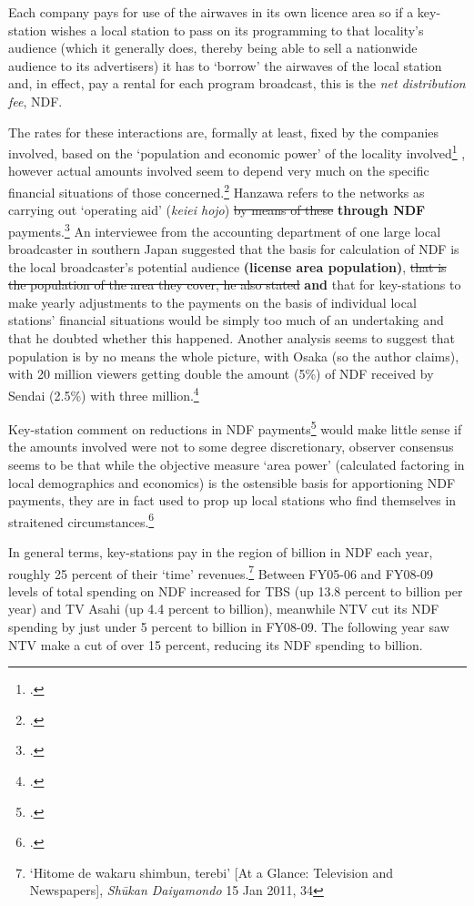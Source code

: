 \documentclass[11pt, oneside, a4paper, headsepline]{scrartcl}
\newcommand{\citej}[2] {\footcite[\nopp #1]{#2} }
\newcommand{\cjk}[1]{{\fontspec[Scale=0.9]{Hiragino Mincho Pro}#1}}
\newcommand{\ty}{\textyen}
\begin{document}
\bigskip

Each company pays for use of the airwaves in its own licence area so if a key-station wishes a local station to pass on its programming to that locality's audience (which it generally does, thereby being able to sell a nationwide audience to its advertisers) it has to `borrow' the airwaves of the local station and, in effect, pay a rental for each program broadcast, this is the \emph{net distribution fee}, NDF.

The rates for these interactions are, formally at least, fixed by the companies involved, based on the `population and economic power' of the locality involved\citej{139--40}{Sugaya:2000}, however actual amounts involved seem to depend very much on the specific financial situations of those concerned.\citej{109}{Usui:2003} Hanzawa refers to the networks as carrying out `operating aid' (\emph{keiei hojo}) \st{by means of these} \textbf{through NDF} payments.\citej{1}{Hanzawa:2003} An interviewee from the accounting department of one large local broadcaster in southern Japan suggested that the basis for calculation of NDF is the local broadcaster's potential audience \textbf{(license area population)}, \st{that is the population of the area they cover, he also stated} \textbf{and} that for key-stations to make yearly adjustments to the payments on the basis of individual local stations' financial situations would be simply too much of an undertaking and that he doubted whether this happened. Another analysis seems to suggest that population is by no means the whole picture, with Osaka (so the author claims), with 20 million viewers getting double the amount (5\%) of NDF received by Sendai (2.5\%) with three million.\citej{41}{Tanami:2006}%

Key-station comment on reductions in NDF payments\citej{73}{Suzuki:2004} would make little sense if the amounts involved were not to some degree discretionary, observer consensus seems to be that while the objective measure `area power' (calculated factoring in local demographics and economics) is the ostensible basis for apportioning NDF payments, they are in fact used to prop up local stations who find themselves in straitened circumstances.\citej{32}{Nishi:2007}

In general terms, key-stations pay in the region of \ty30 billion in NDF each year, roughly 25 percent of their `time' revenues.\footnote{`Hitome de wakaru shimbun, terebi' [At a Glance: Television and Newspapers], \emph{Sh\={u}kan Daiyamondo} 15 Jan 2011, 34} Between FY05-06 and FY08-09 levels of total spending on NDF increased for TBS (up 13.8 percent to \ty30.5 billion per year) and TV Asahi (up 4.4 percent to \ty23.8 billion), meanwhile NTV cut its NDF spending by just under 5 percent to \ty34.1 billion in FY08-09. The following year saw NTV make a cut of over 15 percent, reducing its NDF spending to \ty28.8 billion.
\end{document}
